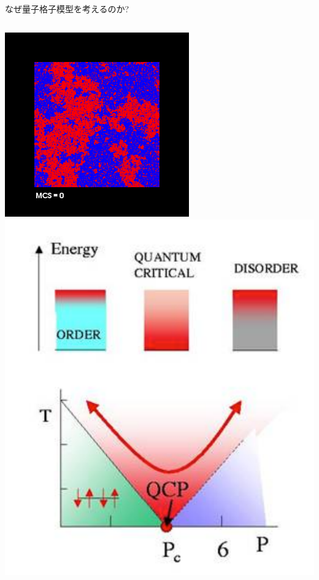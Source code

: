 \subsection*{\redb\whiteb\greenb}
\begin{frame}[t,fragile]{なぜ量子格子模型を考えるのか?}
  \begin{columns}[T]
    \begin{column}{.2\textwidth}
      \includegraphics[width=\textwidth]{ising-tc.png} \\
      \includegraphics[width=\textwidth]{qcp.pdf}

\end{column}
\end{columns}
\end{frame}
